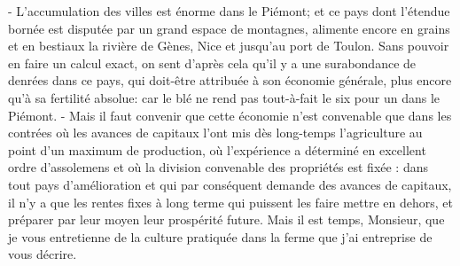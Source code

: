 - L'accumulation des villes est énorme dans le Piémont; et ce pays dont l'étendue bornée est disputée par un grand espace de montagnes, alimente encore en grains et en bestiaux la rivière de Gènes, Nice et jusqu'au port de Toulon. Sans pouvoir en faire un calcul exact, on sent d'après cela qu'il y a une surabondance de denrées dans ce pays, qui doit-être attribuée à son économie générale, plus encore qu'à sa fertilité absolue: car le blé ne rend pas tout-à-fait le six pour un dans le Piémont.
- Mais il faut convenir que cette économie n'est convenable que dans les contrées où les avances de capitaux l'ont mis dès long-temps l'agriculture au point d'un maximum de production, où l'expérience a déterminé\setcounter{page}{403} en excellent ordre d'assolemens et où la division convenable des propriétés est fixée : dans tout pays d'amélioration et qui par conséquent demande des avances de capitaux, il n'y a que les rentes fixes à long terme qui puissent les faire mettre en dehors, et préparer par leur moyen leur prospérité future.
Mais il est temps, Monsieur, que je vous entretienne de la culture pratiquée dans la ferme que j'ai entreprise de vous décrire.
